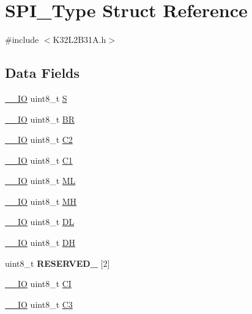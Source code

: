 \hypertarget{struct_s_p_i___type}{}\section{S\+P\+I\+\_\+\+Type Struct Reference}
\label{struct_s_p_i___type}


{\ttfamily \#include $<$K32\+L2\+B31\+A.\+h$>$}

\subsection*{Data Fields}
\begin{DoxyCompactItemize}
\item 
\mbox{\hyperlink{core__cm0plus_8h_aec43007d9998a0a0e01faede4133d6be}{\+\_\+\+\_\+\+IO}} uint8\+\_\+t \mbox{\hyperlink{struct_s_p_i___type_a0542ffc7618a0893938748eef9c87474}{S}}
\item 
\mbox{\hyperlink{core__cm0plus_8h_aec43007d9998a0a0e01faede4133d6be}{\+\_\+\+\_\+\+IO}} uint8\+\_\+t \mbox{\hyperlink{struct_s_p_i___type_a5bfe1e18e59f29dbbec3aca61ab9e4a8}{BR}}
\item 
\mbox{\hyperlink{core__cm0plus_8h_aec43007d9998a0a0e01faede4133d6be}{\+\_\+\+\_\+\+IO}} uint8\+\_\+t \mbox{\hyperlink{struct_s_p_i___type_a4f920936a8fc32483b3ebd9b0674b450}{C2}}
\item 
\mbox{\hyperlink{core__cm0plus_8h_aec43007d9998a0a0e01faede4133d6be}{\+\_\+\+\_\+\+IO}} uint8\+\_\+t \mbox{\hyperlink{struct_s_p_i___type_ad54aa92be9fc988e74d55d2d3daae8ad}{C1}}
\item 
\mbox{\hyperlink{core__cm0plus_8h_aec43007d9998a0a0e01faede4133d6be}{\+\_\+\+\_\+\+IO}} uint8\+\_\+t \mbox{\hyperlink{struct_s_p_i___type_a5f8b81ae482da669eb9402d4b7db9093}{ML}}
\item 
\mbox{\hyperlink{core__cm0plus_8h_aec43007d9998a0a0e01faede4133d6be}{\+\_\+\+\_\+\+IO}} uint8\+\_\+t \mbox{\hyperlink{struct_s_p_i___type_aea2fccc9fc351b426a4d0789546eaa88}{MH}}
\item 
\mbox{\hyperlink{core__cm0plus_8h_aec43007d9998a0a0e01faede4133d6be}{\+\_\+\+\_\+\+IO}} uint8\+\_\+t \mbox{\hyperlink{struct_s_p_i___type_ac1e77cf0d67fe29fd8a408d0ade2dd04}{DL}}
\item 
\mbox{\hyperlink{core__cm0plus_8h_aec43007d9998a0a0e01faede4133d6be}{\+\_\+\+\_\+\+IO}} uint8\+\_\+t \mbox{\hyperlink{struct_s_p_i___type_ab50f078a2c98c9d728f29125df6032cb}{DH}}
\item 
\mbox{\label{struct_s_p_i___type_a1d386ff4b328960f430b4c63f61423fa}} 
uint8\+\_\+t {\bfseries R\+E\+S\+E\+R\+V\+E\+D\+\_} \mbox{[}2\mbox{]}
\item 
\mbox{\hyperlink{core__cm0plus_8h_aec43007d9998a0a0e01faede4133d6be}{\+\_\+\+\_\+\+IO}} uint8\+\_\+t \mbox{\hyperlink{struct_s_p_i___type_a247a9bdfd7730b209d0eb1a9d5ef6a8f}{CI}}
\item 
\mbox{\hyperlink{core__cm0plus_8h_aec43007d9998a0a0e01faede4133d6be}{\+\_\+\+\_\+\+IO}} uint8\+\_\+t \mbox{\hyperlink{struct_s_p_i___type_a6533a725e5ee4892879f0b6d9dd6675a}{C3}}
\end{DoxyCompactItemize}


